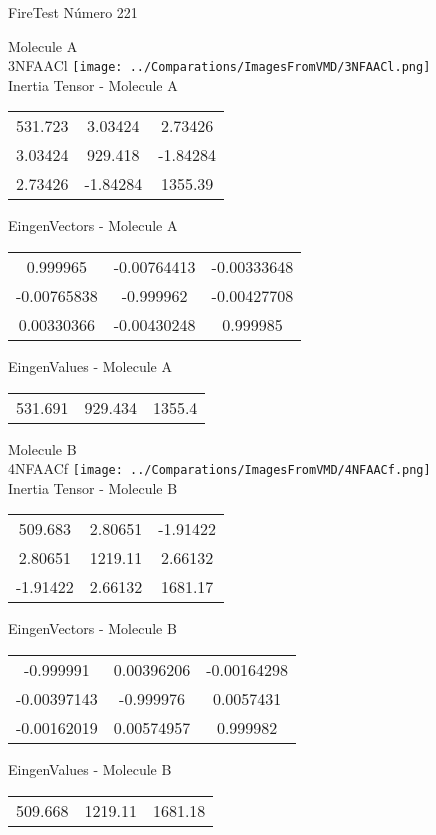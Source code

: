 \vtab[-2cm]
\begin{center}
{\large FireTest \tab Número 221}
\end{center}
\begin{multicols}{2}
\begin{center}

Molecule A \\ 
3NFAACl
\texttt{[image: ../Comparations/ImagesFromVMD/3NFAACl.png]}
\\
Inertia Tensor - Molecule A \\
\vtab

\begin{tabular}{|c c c|}
531.723	 & 	3.03424	 & 	2.73426	 \\
3.03424	 & 	929.418	 & 	-1.84284	 \\
2.73426	 & 	-1.84284	 & 	1355.39
\end{tabular}

\vtab
 EingenVectors - Molecule A     \\
\vtab
\begin{tabular}{|c c c|}
0.999965	 & 	-0.00764413	 & 	-0.00333648	 \\
-0.00765838	 & 	-0.999962	 & 	-0.00427708	 \\
0.00330366	 & 	-0.00430248	 & 	0.999985
\end{tabular}

\vtab
 EingenValues - Molecule A     \\
\vtab
\begin{tabular}{|c c c|}
531.691	 & 	929.434	 & 	1355.4	 \\
\end{tabular}
\columnbreak

Molecule B \\ 
4NFAACf
\texttt{[image: ../Comparations/ImagesFromVMD/4NFAACf.png]}
\\
Inertia Tensor - Molecule B \\
\vtab

\begin{tabular}{|c c c|}
509.683	 & 	2.80651	 & 	-1.91422	 \\
2.80651	 & 	1219.11	 & 	2.66132	 \\
-1.91422	 & 	2.66132	 & 	1681.17
\end{tabular}

\vtab
 EingenVectors - Molecule B     \\
\vtab
\begin{tabular}{|c c c|}
-0.999991	 & 	0.00396206	 & 	-0.00164298	 \\
-0.00397143	 & 	-0.999976	 & 	0.0057431	 \\
-0.00162019	 & 	0.00574957	 & 	0.999982
\end{tabular}

\vtab
 EingenValues - Molecule B     \\
\vtab
\begin{tabular}{|c c c|}
509.668	 & 	1219.11	 & 	1681.18	 \\
\end{tabular}

\end{center}
\end{multicols}
